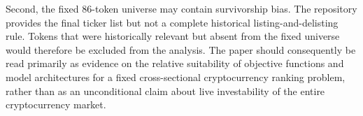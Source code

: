 Second, the fixed 86-token universe may contain survivorship bias.
The repository provides the final ticker list but not a complete historical
listing-and-delisting rule.
Tokens that were historically relevant but absent from the fixed universe
would therefore be excluded from the analysis.
The paper should consequently be read primarily as evidence on the relative
suitability of objective functions and model architectures for a fixed
cross-sectional cryptocurrency ranking problem, rather than as an
unconditional claim about live investability of the entire cryptocurrency
market.
